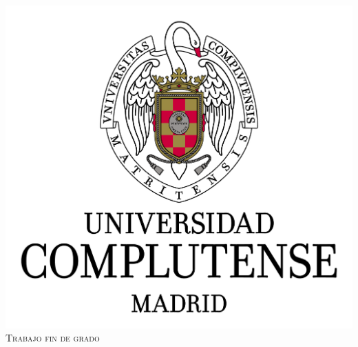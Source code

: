 	
	\begin{titlepage}
		
		\newcommand{\HRule}{\rule{\linewidth}{0.25mm}} %
		
		\center %
		

		
		\includegraphics{images/ucmLogo.png}\\[0.02cm] %
		
		\textsc{\Large Trabajo fin de grado}\\[0.5cm] 
		
		

\end{titlepage}
